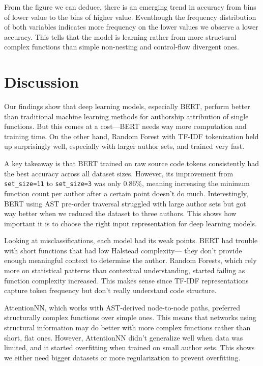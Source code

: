 \documentclass{article}
\begin{document}
From the figure we can deduce, there is an emerging trend in accuracy from bins of lower value to the bins of higher value.
Eventhough the frequency distribution of both variables indicates more frequency on the lower values we observe a lower
accuracy. This tells that the model is learning rather from more structural complex functions than simple non-nesting and 
control-flow divergent ones.

\section{Discussion}

Our findings show that deep learning models, especially BERT, perform better than traditional machine learning methods for authorship attribution 
of single functions. But this comes at a cost—BERT needs way more computation and training time. On the other hand, Random Forest with TF-IDF 
tokenization held up surprisingly well, especially with larger author sets, and trained very fast.

A key takeaway is that BERT trained on raw source code tokens consistently had the best accuracy across all dataset sizes. However, 
its improvement from \texttt{set\_size=11} to \texttt{set\_size=3} was only 0.86\%, meaning increasing the minimum function count per author 
after a certain point doesn’t do much. Interestingly, BERT using AST pre-order traversal struggled with large author sets but got way better 
when we reduced the dataset to three authors. This shows how important it is to choose the right input representation for deep learning models.

Looking at misclassifications, each model had its weak points. BERT had trouble with short functions that had low Halstead complexity— they 
don’t provide enough meaningful context to determine the author. Random Forests, which rely more on statistical patterns than contextual 
understanding, started failing as function complexity increased. This makes sense since TF-IDF representations capture token frequency but 
don’t really understand code structure.

AttentionNN, which works with AST-derived node-to-node paths, preferred structurally complex functions over simple ones. This means that 
networks using structural information may do better with more complex functions rather than short, flat ones. However, AttentionNN didn’t 
generalize well when data was limited, and it started overfitting when trained on small author sets. This shows we either need bigger 
datasets or more regularization to prevent overfitting.
\end{document}
